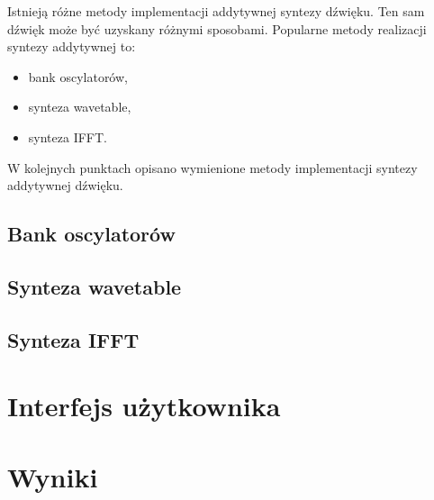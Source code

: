 Istnieją różne metody implementacji addytywnej syntezy dźwięku. Ten sam dźwięk może być uzyskany różnymi sposobami. Popularne metody realizacji syntezy addytywnej to:
\begin{itemize}
	\item bank oscylatorów,
	\item synteza wavetable,
	\item synteza IFFT.
\end{itemize}
W kolejnych punktach opisano wymienione metody implementacji syntezy addytywnej dźwięku.

\subsection{Bank oscylatorów}

\subsection{Synteza wavetable}

\subsection{Synteza IFFT}


\section{Interfejs użytkownika}


\section{Wyniki}